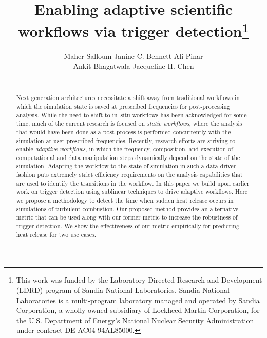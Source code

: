 \documentclass{sig-alternate}
\begin{document}
\title{ Enabling adaptive scientific workflows via trigger detection\thanks{This work was funded by the Laboratory Directed
Research and Development (LDRD) program of  Sandia National Laboratories. Sandia
National Laboratories is a multi-program laboratory managed and operated by
Sandia Corporation, a wholly owned subsidiary of Lockheed Martin Corporation,
for the U.S. Department of Energy's National Nuclear Security Administration
under contract DE-AC04-94AL85000.}}
\author{
\alignauthor Maher Salloum \quad  Janine C. Bennett  \quad Ali Pinar \\
Ankit Bhagatwala  \quad Jacqueline H. Chen\\
       \\
}
\maketitle
\begin{abstract}
Next generation architectures necessitate a shift away from traditional workflows in
which the simulation state is saved at prescribed frequencies for
post-processing analysis. While the need to shift to in~situ workflows has been 
acknowledged for some time, much of the current research is focused on
\emph{static workflows}, where the analysis that would have been done as a
post-process is performed concurrently with the simulation at user-prescribed
frequencies.  Recently, research efforts are striving to enable \emph{adaptive workflows}, 
in which the frequency, composition, and execution of  computational and data
manipulation steps dynamically depend on the state of the simulation.  Adapting
the workflow to the state of simulation in such a data-driven fashion puts
extremely strict efficiency requirements on the analysis capabilities that are used  
to identify the transitions  in the  workflow. 
In this paper we build upon earlier work on trigger detection using sublinear
techniques to drive adaptive workflows.  Here we propose a methodology  to
detect the time when sudden heat release occurs in
simulations of turbulent combustion.  Our proposed method provides an alternative metric that can be used 
along with our former metric to increase the robustness 
of trigger detection.  We show the effectiveness of our metric empirically for
predicting heat release for two use cases. 
\end{abstract}
\end{document}
